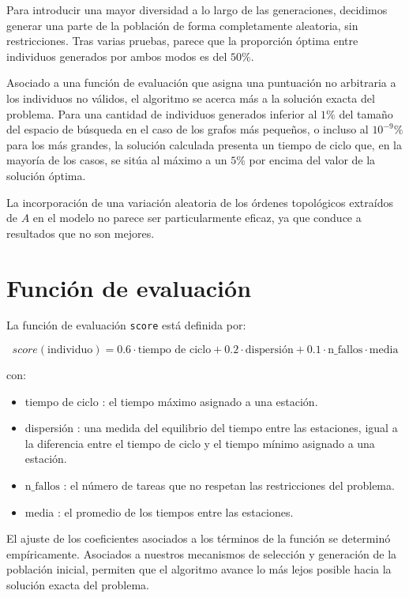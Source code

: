 \documentclass[12pt,a4paper]{report}
\begin{document}
Para introducir una mayor diversidad a lo largo de las generaciones, decidimos generar una parte de la población de forma completamente aleatoria, sin restricciones. Tras varias pruebas, parece que la proporción óptima entre individuos generados por ambos modos es del $50\%$.

Asociado a una función de evaluación que asigna una puntuación no arbitraria a los individuos no válidos, el algoritmo se acerca más a la solución exacta del problema. Para una cantidad de individuos generados inferior al $1\%$ del tamaño del espacio de búsqueda en el caso de los grafos más pequeños, o incluso al $10^{-9}\%$ para los más grandes, la solución calculada presenta un tiempo de ciclo que, en la mayoría de los casos, se sitúa al máximo a un $5\%$ por encima del valor de la solución óptima.

La incorporación de una variación aleatoria de los órdenes topológicos extraídos de $A$ en el modelo no parece ser particularmente eficaz, ya que conduce a resultados que no son mejores.

\section{Función de evaluación}

La función de evaluación \texttt{score} está definida por:

\[
score(\text{individuo}) = 0.6 \cdot \text{tiempo de ciclo} + 0.2 \cdot \text{dispersión} + 0.1 \cdot \text{n\_fallos} \cdot \text{media}
\]
\vspace{0.5cm}

con:

\begin{itemize}
\item tiempo de ciclo : el tiempo máximo asignado a una estación.
\item dispersión : una medida del equilibrio del tiempo entre las estaciones,
igual a la diferencia entre el tiempo de ciclo y el tiempo mínimo asignado a una estación.
\item $\text{n\_fallos}$ : el número de tareas que no respetan las restricciones del problema.
\item media : el promedio de los tiempos entre las estaciones.
\end{itemize}

El ajuste de los coeficientes asociados a los términos de la función se determinó empíricamente. Asociados a nuestros mecanismos de selección y generación de la población inicial, permiten que el algoritmo avance lo más lejos posible hacia la solución exacta del problema.
\end{document}
